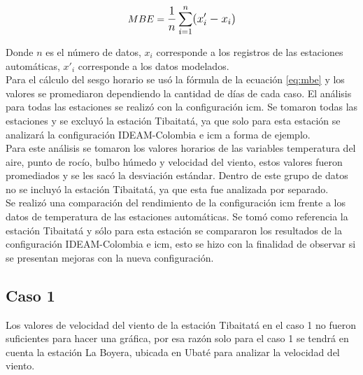 \begin{equation}\label{eq:mbe}
MBE = \mathlarger{\frac{1}{n} \sum_{i=1}^n (x'_i - x_i)}
\end{equation}

Donde $n$ es el número de datos, $x_i$ corresponde a los registros de las estaciones automáticas, $x'_i$ corresponde a los datos modelados.\\
Para el cálculo del sesgo horario se usó la fórmula de la ecuación \ref{eq:mbe} y los valores se promediaron dependiendo la cantidad de días de cada caso. El análisis para todas las estaciones se realizó con la configuración icm. Se tomaron todas las estaciones y se excluyó la estación Tibaitatá, ya que solo para esta estación se analizará la configuración IDEAM-Colombia e icm a forma de ejemplo.\\

Para este análisis se tomaron los valores horarios de las variables temperatura del aire, punto de rocío, bulbo húmedo y velocidad del viento, estos valores fueron promediados y se les sacó la desviación estándar. Dentro de este grupo de datos no se incluyó la estación Tibaitatá, ya que esta fue analizada por separado.\\

Se realizó una comparación del rendimiento de la configuración icm frente a los datos de temperatura de las estaciones automáticas. Se tomó como referencia la estación Tibaitatá y sólo para esta estación se compararon los resultados de la configuración IDEAM-Colombia e icm, esto se hizo con la finalidad de observar si se presentan mejoras con la nueva configuración.\\

\subsection{Caso 1}

Los valores de velocidad del viento de la estación Tibaitatá en el caso 1 no fueron suficientes para hacer una gráfica, por esa razón solo para el caso 1 se tendrá en cuenta la estación La Boyera, ubicada en Ubaté para analizar la velocidad del viento.
	
